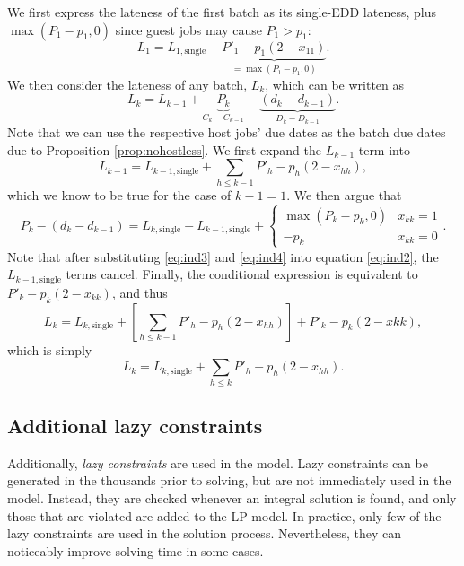 \documentclass[oribibl]{llncs}
\begin{document}
\pagebreak
We first express the lateness of the first batch as its single-EDD lateness,
plus $\max(P_1 - p_1, 0)$ since guest jobs may cause $P_1 > p_1$:
\begin{equation}
  \label{eq:ind1}
  L_1 = L_{1,\mathrm{single}} + \underbrace{P'_1 -
  p_1(2-x_{11})}_{=\max(P_1-p_1,0)}.
\end{equation}
We then consider the lateness of any batch, $L_k$, which can be written as
\begin{equation}
  \label{eq:ind2}
  L_k = L_{k-1} + \underbrace{P_k}_{C_k-C_{k-1}} - \underbrace{(d_k -
  d_{k-1})}_{D_k-D_{k-1}}.
\end{equation}
Note that we can use the respective host jobs' due dates as the batch due dates
due to Proposition \ref{prop:nohostless}.
We first expand the $L_{k-1}$ term into
\begin{equation}
  \label{eq:ind3}
  L_{k-1} = L_{k-1,\mathrm{single}} + \sum_{h\leq k-1} P'_h - p_h(2-x_{hh}),
\end{equation}
which we know to be true for the case of $k-1 = 1$. We then argue that
\begin{equation}
  \label{eq:ind4}
  P_k - (d_k - d_{k-1}) = L_{k,\mathrm{single}} - L_{k-1,\mathrm{single}} +
\begin{cases}\max(P_k-p_k,0)&x_{kk}=1\\-p_k&x_{kk}=0\end{cases}.
\end{equation}
Note that after substituting \eqref{eq:ind3} and \eqref{eq:ind4} into equation
\eqref{eq:ind2}, the $L_{k-1,\mathrm{single}}$ terms cancel. Finally, the
conditional expression is equivalent to $P'_k - p_k(2-x_{kk})$, and thus
\begin{equation}
  L_k = L_{k,\mathrm{single}} + \left[\sum_{h\leq k-1} P'_h -
  p_h(2-x_{hh})\right] + P'_k - p_k(2-x{kk}),
\end{equation}
which is simply
\begin{equation}
  L_k = L_{k,\mathrm{single}} + \sum_{h\leq k} P'_h - p_h(2 -
x_{hh}).
\end{equation}
\pagebreak
\subsection{Additional lazy constraints}
Additionally, \textit{lazy constraints} \cite{cplexmanual} are used in the model. Lazy
constraints can be generated in the thousands prior to solving, but are
not immediately used in the model. Instead, they are checked
whenever an integral solution is found, and only those that are violated
are added to the LP model. In practice, only few of the lazy constraints
are used in the solution process. Nevertheless, they can noticeably
improve solving time in some cases.
\end{document}
